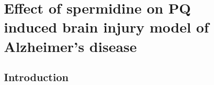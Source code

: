 \chapter{Effect of spermidine on PQ induced brain injury model of Alzheimer’s disease}
\section{Introduction}
